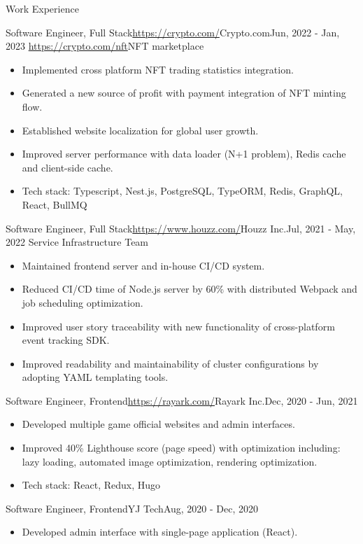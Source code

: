 \documentclass[]{mcdowellcv}
\begin{document}
	\begin{cvsection}{Work Experience}
		\begin{cvsubsection}{Software Engineer, Full Stack}{\url{https://crypto.com/}{Crypto.com}}{Jun, 2022 - Jan, 2023}
			\url{https://crypto.com/nft}{NFT marketplace}
			\begin{itemize}
				\item Implemented cross platform NFT trading statistics integration.
				\item Generated a new source of profit with payment integration of NFT minting flow.
				\item Established website localization for global user growth.
				\item Improved server performance with data loader (N+1 problem), Redis cache and client-side cache.
				\item Tech stack: Typescript, Nest.js, PostgreSQL, TypeORM, Redis, GraphQL, React, BullMQ
			\end{itemize}
		\end{cvsubsection}
		
		\begin{cvsubsection}{Software Engineer, Full Stack}{\url{https://www.houzz.com/}{Houzz Inc.}}{Jul, 2021 - May, 2022}	
			Service Infrastructure Team
			\begin{itemize}
				\item Maintained frontend server and in-house CI/CD system.
				\item Reduced CI/CD time of Node.js server by 60\% with distributed Webpack and job scheduling optimization.
				\item Improved user story traceability with new functionality of cross-platform event tracking SDK.
				\item Improved readability and maintainability of cluster configurations by adopting YAML templating tools.
			\end{itemize}
		\end{cvsubsection}
		
		\begin{cvsubsection}{Software Engineer, Frontend}{\url{https://rayark.com/}{Rayark Inc.}}{Dec, 2020 - Jun, 2021}		
			\begin{itemize}
				\item Developed multiple game official websites and admin interfaces.
				\item Improved 40\% Lighthouse score (page speed) with optimization including: lazy loading, automated image optimization, rendering optimization.
				\item Tech stack: React, Redux, Hugo
			\end{itemize}
		\end{cvsubsection}
		
		\begin{cvsubsection}{Software Engineer, Frontend}{YJ Tech}{Aug, 2020 - Dec, 2020}
			\begin{itemize}
				\item Developed admin interface with single-page application (React).
			\end{itemize}
		\end{cvsubsection}
	\end{cvsection}
	
\end{document}
